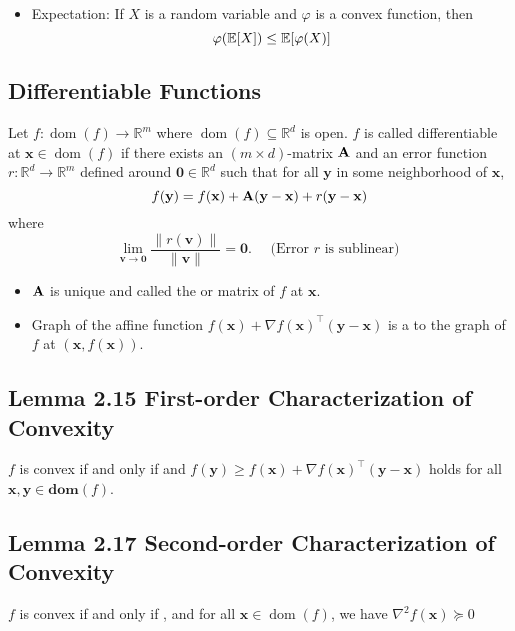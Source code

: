 \begin{itemize}[leftmargin=*]
    \item Expectation: If $X$ is a random variable and $\varphi$ is a convex function, then
    $$
    \varphi(\operatorname{\mathbb{E}}[X]) \leq \operatorname{\mathbb{E}}[\varphi(X)]
    $$
\end{itemize}

\subsection*{Differentiable Functions}
Let $f: \operatorname{dom}(f) \rightarrow \mathbb{R}^{m}$ where $\operatorname{dom}(f) \subseteq \mathbb{R}^{d}$ is open. $f$ is called differentiable at $\mathbf{x} \in \operatorname{dom}(f)$ if there exists an $(m \times d)$-matrix $\boldsymbol{\mathbf{A}}$ and an error function $r: \mathbb{R}^{d} \rightarrow \mathbb{R}^{m}$ defined around $\mathbf{0} \in \mathbb{R}^{d}$ such that for all $\mathbf{y}$ in some neighborhood of $\mathbf{x}$,
$$
f(\mathbf{y})=f(\mathbf{x})+\boldsymbol{\mathbf{A}}(\mathbf{y}-\mathbf{x})+r(\mathbf{y}-\mathbf{x})
$$
where
$$
\lim _{\mathbf{v} \rightarrow \mathbf{0}} \frac{\|r(\mathbf{v})\|}{\|\mathbf{v}\|}=\mathbf{0} . \quad \text { (Error } r \text { is sublinear) }
$$

\begin{itemize}[leftmargin=*]
    \item $\boldsymbol{\mathbf{A}}$ is unique and called the  or  matrix of $f$ at $\mathbf{x}$.
    \item Graph of the affine function $f(\mathbf{x})+\nabla f(\mathbf{x})^{\top}(\mathbf{y}-\mathbf{x})$ is a  to the graph of $f$ at $(\mathbf{x}, f(\mathbf{x}))$.
\end{itemize}

\subsection*{Lemma 2.15 First-order Characterization of Convexity}
$f$ is convex if and only if  and
$
f(\mathbf{y}) \geq f(\mathbf{x})+\nabla f(\mathbf{x})^{\top}(\mathbf{y}-\mathbf{x})
$
holds for all $\mathbf{x}, \mathbf{y} \in \mathbf{d o m}(f)$.

\subsection*{Lemma 2.17 Second-order Characterization of Convexity}
$f$ is convex if and only if , and for all $\mathbf{x} \in \operatorname{dom}(f)$, we have
$
\nabla^{2} f(\mathbf{x}) \succeq 0
$



